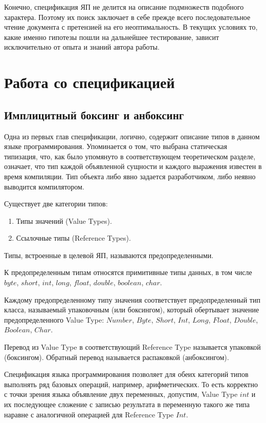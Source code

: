 \documentclass{mipt-thesis-bs}
\begin{document}
Конечно, спецификация ЯП не делится на описание подмножеств подобного характера. Поэтому их поиск 
заключает в себе прежде всего последовательное чтение документа с претензией на его неоптимальность.
В текущих условиях то, какие именно гипотезы пошли на дальнейшее тестирование, зависит
исключительно от опыта и знаний автора работы.

\section{Работа со спецификацией}

\subsection{Имплицитный боксинг и анбоксинг}

Одна из первых глав спецификации, логично, содержит описание типов в данном языке 
программирования. Упоминается о том, что выбрана статическая типизация, что, как 
было упомянуто в соответствующем теоретическом разделе, означает, что тип 
каждой объявленной сущности и каждого выражения известен в
время компиляции. Тип объекта либо явно задается разработчиком, 
либо неявно выводится компилятором.

Существует две категории типов:
\begin{enumerate}
    \item Типы значений (Value Types).
    \item Ссылочные типы (Reference Types).
\end{enumerate}

Типы, встроенные в целевой ЯП, называются предопределенными.

К предопределенным типам относятся примитивные типы данных, в том числе 
$byte$, $short$, $int$, $long$, $float$, $double$, $boolean$, $char$.

Каждому предопределенному типу значения соответствует 
предопределенный тип класса, называемый 
упаковочным (или боксингом), который обертывает значение предопределенного 
Value Type: $Number$, $Byte$, $Short$, $Int$, $Long$, $Float$, $Double$, $Boolean$, $Char$.

Перевод из Value Type в соответствующий Reference Type называется упаковкой
(боксингом). Обратный перевод называется распаковкой (анбоксингом).

Спецификация языка программирования позволяет для обеих категорий типов выполнять ряд
базовых операций, например, арифметических. То есть корректно с точки зрения языка
объявление двух переменных, допустим, Value Type $int$ и их последующее сложение с записью
результата в переменную такого же типа наравне с аналогичной операцией для Reference Type $Int$.
\end{document}

